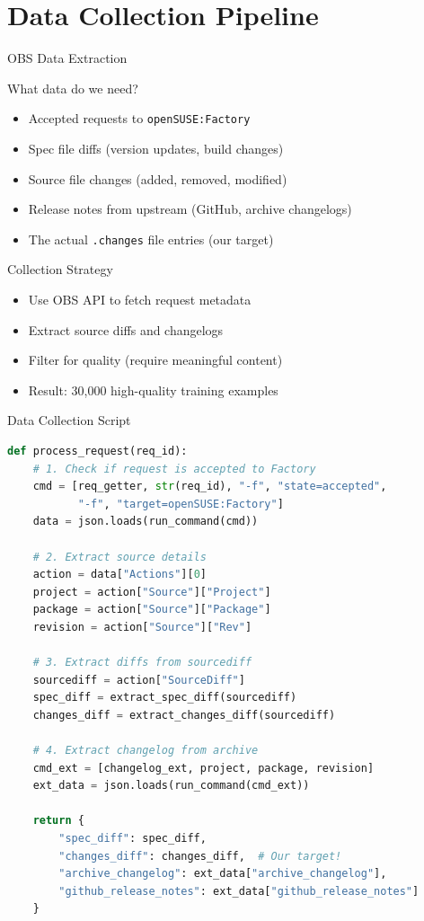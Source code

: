 \section{Data Collection Pipeline}
\begin{frame}[fragile]{OBS Data Extraction}
\begin{block}{What data do we need?}
\begin{itemize}
  \item Accepted requests to \texttt{openSUSE:Factory}
  \item Spec file diffs (version updates, build changes)
  \item Source file changes (added, removed, modified)
  \item Release notes from upstream (GitHub, archive changelogs)
  \item The actual \texttt{.changes} file entries (our target)
\end{itemize}
\end{block}

\begin{block}{Collection Strategy}
\begin{itemize}
  \item Use OBS API to fetch request metadata
  \item Extract source diffs and changelogs
  \item Filter for quality (require meaningful content)
  \item Result: 30,000 high-quality training examples
\end{itemize}
\end{block}
\end{frame}

\begin{frame}[fragile]{Data Collection Script}
\begin{lstlisting}[language=Python, basicstyle=\ttfamily\tiny]
def process_request(req_id):
    # 1. Check if request is accepted to Factory
    cmd = [req_getter, str(req_id), "-f", "state=accepted",
           "-f", "target=openSUSE:Factory"]
    data = json.loads(run_command(cmd))

    # 2. Extract source details
    action = data["Actions"][0]
    project = action["Source"]["Project"]
    package = action["Source"]["Package"]
    revision = action["Source"]["Rev"]

    # 3. Extract diffs from sourcediff
    sourcediff = action["SourceDiff"]
    spec_diff = extract_spec_diff(sourcediff)
    changes_diff = extract_changes_diff(sourcediff)

    # 4. Extract changelog from archive
    cmd_ext = [changelog_ext, project, package, revision]
    ext_data = json.loads(run_command(cmd_ext))

    return {
        "spec_diff": spec_diff,
        "changes_diff": changes_diff,  # Our target!
        "archive_changelog": ext_data["archive_changelog"],
        "github_release_notes": ext_data["github_release_notes"]
    }
\end{lstlisting}
\end{frame}

